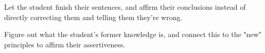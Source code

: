Let the student finish their sentences, and affirm their conclusions instead of directly correcting them and telling them they're wrong.

Figure out what the student's former knowledge is, and connect this to the "new" principles to affirm their assertiveness.


